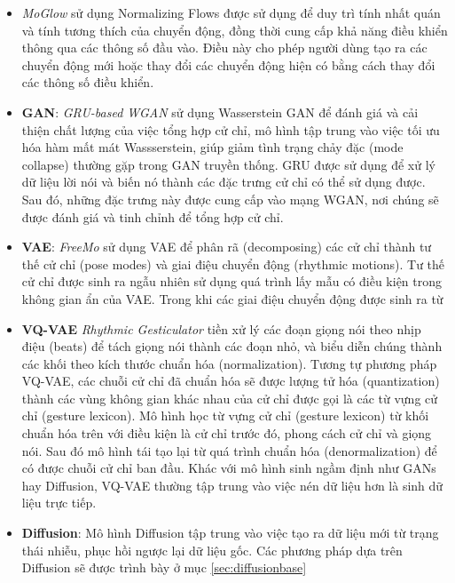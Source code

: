 \begin{itemize}
	\item \textit{MoGlow} \cite{henter2020moglow} sử dụng Normalizing Flows được sử dụng để duy trì tính nhất quán và tính tương thích của chuyển động, đồng thời cung cấp khả năng điều khiển thông qua các thông số đầu vào. Điều này cho phép người dùng tạo ra các chuyển động mới hoặc thay đổi các chuyển động hiện có bằng cách thay đổi các thông số điều khiển.
	
	\item \textbf{GAN}: \textit{GRU-based WGAN} \cite{wu2021probabilistic} sử dụng Wasserstein GAN để đánh giá và cải thiện chất lượng của việc tổng hợp cử chỉ, mô hình tập trung vào việc tối ưu hóa hàm mất mát Wassserstein, giúp giảm tình trạng chảy đặc (mode collapse) thường gặp trong GAN truyền thống. GRU được sử dụng để xử lý dữ liệu lời nói và biến nó thành các đặc trưng cử chỉ có thể sử dụng được. Sau đó, những đặc trưng này được cung cấp vào mạng WGAN, nơi chúng sẽ được đánh giá và tinh chỉnh để tổng hợp cử chỉ.
	
	\item \textbf{VAE}:  \textit{FreeMo} \cite{xu2022freeform} sử dụng VAE để phân rã (decomposing) các cử chỉ thành tư thế cử chỉ (pose modes) và giai điệu chuyển động (rhythmic motions). Tư thế cử chỉ được sinh ra ngẫu nhiên sử dụng quá trình lấy mẫu có điều kiện trong không gian ẩn của VAE. Trong khi các giai điệu chuyển động được sinh ra từ 
	
	\item \textbf{VQ-VAE} \textit{Rhythmic Gesticulator} \cite{ao2022rhythmic} tiền xử lý các đoạn giọng nói theo nhịp điệu (beats) để tách giọng nói thành các đoạn nhỏ, và biểu diễn chúng thành các khối theo kích thước chuẩn hóa (normalization). Tương tự phương pháp VQ-VAE, các chuỗi cử chỉ đã chuẩn hóa sẽ được lượng tử hóa (quantization) thành các vùng không gian khác nhau của cử chỉ được gọi là các từ vựng cử chỉ (gesture lexicon). Mô hình học từ vựng cử chỉ (gesture lexicon) từ khối chuẩn hóa trên với điều kiện là cử chỉ trước đó, phong cách cử chỉ và giọng nói. Sau đó mô hình tái tạo lại từ quá trình chuẩn hóa (denormalization) để có được chuỗi cử chỉ ban đầu. Khác với mô hình sinh ngầm định như GANs hay Diffusion, VQ-VAE thường tập trung vào việc nén dữ liệu hơn là sinh dữ liệu trực tiếp.
	
	\item \textbf{Diffusion}:  Mô hình Diffusion tập trung vào việc tạo ra dữ liệu mới từ trạng thái nhiễu, phục hồi ngược lại dữ liệu gốc. Các phương pháp dựa trên Diffusion sẽ được trình bày ở mục \autoref{sec:diffusionbase}
	
\end{itemize}


